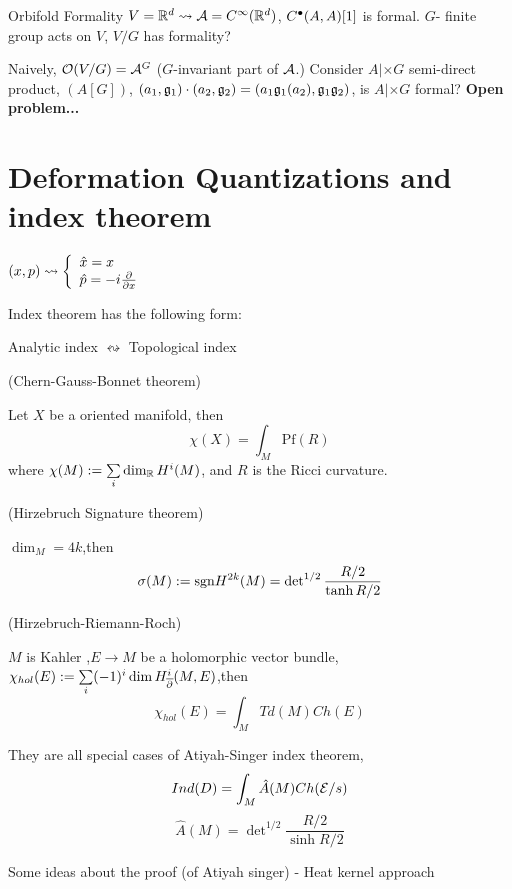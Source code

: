 Orbifold Formality $V=\mathbb{R}^d\rightsquigarrow\mathcal{A}=C^\infty(\mathbb{R}^d)$,
$C^{\bullet}(A,A)[1]$ is formal. $G$- finite group acts on $V$,
$V/G$ has formality?

Naively, $\mathcal{O}(V/G)=\mathcal{A}^G$ ($G$-invariant part of $\mathcal{A}$.)
Consider $A|\times G$ semi-direct product,
$(A[G])$, $(a_1,\mathfrak{g}_1)\cdot(a_2,\mathfrak{g}_2)=(a_1\mathfrak{g}_1(a_2),\mathfrak{g}_1\mathfrak{g}_2)$,
is $A|\times G$ formal? \textbf{Open problem...}



\section{Deformation Quantizations and index theorem}

$(x,p)\rightsquigarrow
  \left\{
    \begin{array}{l}
      \hat{x}=x\\
      \hat{p}=-i\frac{\partial } {\partial x}
    \end{array}
  \right.
$

Index theorem has the following form:

Analytic index $\leftrightsquigarrow$ Topological index

\begin{example}(Chern-Gauss-Bonnet theorem)

Let $X$ be a oriented manifold, then
$$\chi(X)=\int_M\text{Pf}(R)$$
where $\chi(M):=\sum\limits_i\dim_{\mathbb{R}}H^i(M)$, and $R$ is the Ricci curvature.
\end{example}

\begin{example}(Hirzebruch Signature theorem)

$\dim_M=4k$,then
$$\sigma(M):=\text{sgn}H^{2k}(M)
=\det\nolimits^{1/2}\frac{R/2}{\tanh R/2}$$
\end{example}

\begin{example}(Hirzebruch-Riemann-Roch)

$M$ is Kahler ,$E\to M$ be a holomorphic vector bundle,
$\chi_{hol}(E):=\sum\limits_i(-1)^i\dim H_{\overline{\partial}}^i(M,E)$,then
$$\chi_{hol}(E)=\int_M Td(M)Ch(E)$$
\end{example}

They are all special cases of Atiyah-Singer index theorem,
$$Ind(D)=\int_M\hat{A}(M)Ch(\mathcal{E}/s)$$
$$\hat{A}(M)=\det\nolimits^{1/2}\frac{R/2}{\sinh R/2}$$

Some ideas about the proof (of Atiyah singer)
- Heat kernel approach

